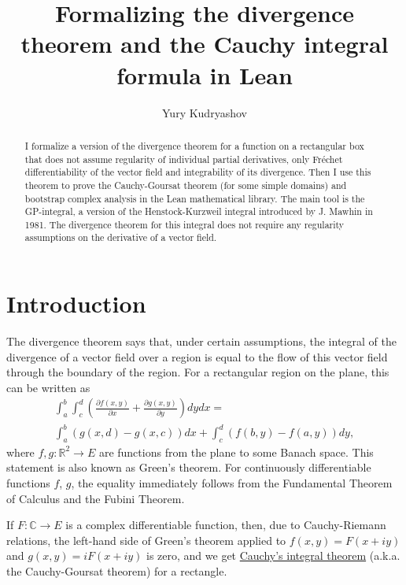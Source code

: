\documentclass[a4paper, UKenglish,cleveref, autoref, thm-restate]{lipics-v2021}
\author{Yury Kudryashov}{University of Toronto at Mississauga, Canada (till July 2022); Texas A\&M University, USA (since August 2022)}{urkud@urkud.name}{https://orcid.org/0000-0003-4286-9276}{}
\title{Formalizing the divergence theorem and the Cauchy integral formula in Lean}
\newcommand{\bbR}{\mathbb{R}}
\newcommand{\bbC}{\mathbb{C}}
\begin{document}
\sloppy
\maketitle

\begin{abstract}
  I formalize a version of the divergence theorem for a function on a
  rectangular box that does not assume regularity of individual
  partial derivatives, only Fréchet differentiability of the vector
  field and integrability of its divergence. Then I use this theorem
  to prove the Cauchy-Goursat theorem (for some simple domains) and
  bootstrap complex analysis in the Lean mathematical library. The
  main tool is the GP-integral, a version of the Henstock-Kurzweil
  integral introduced by J. Mawhin in 1981. The divergence theorem for
  this integral does not require any regularity assumptions on the
  derivative of a vector field.
\end{abstract}

\section{Introduction}\label{sec:introduction}
The divergence theorem says that, under certain assumptions, the
integral of the divergence of a vector field over a region is equal to
the flow of this vector field through the boundary of the region. For
a rectangular region on the plane, this can be written as
\begin{multline}
  \label{eqn:green-rect}
  \int_{a}^{b}\int_{c}^{d}\left(\frac{\partial f(x, y)}{\partial x}+\frac{\partial g(x, y)}{\partial y}\right)dydx=\\
  \int_{a}^{b}\left(g(x, d)-g(x, c)\right)dx+\int_{c}^{d}\left(f(b, y)-f(a, y)\right)dy,
\end{multline}
where \(f, g\colon \bbR^{2}\to E\) are functions from the plane to
some Banach space. This statement is also known as Green's theorem.
For continuously differentiable functions \(f\), \(g\), the equality
immediately follows from the Fundamental Theorem of Calculus and the
Fubini Theorem.

If \(F\colon \bbC\to E\) is a complex differentiable function, then, due
to Cauchy-Riemann relations, the left-hand side of Green's theorem
applied to \(f(x, y)=F(x+iy)\) and \(g(x, y)=iF(x+iy)\) is zero, and
we get
\href{https://en.wikipedia.org/wiki/Cauchy's_integral_theorem}{Cauchy's
  integral theorem} (a.k.a. the Cauchy-Goursat theorem) for a rectangle.
\end{document}
